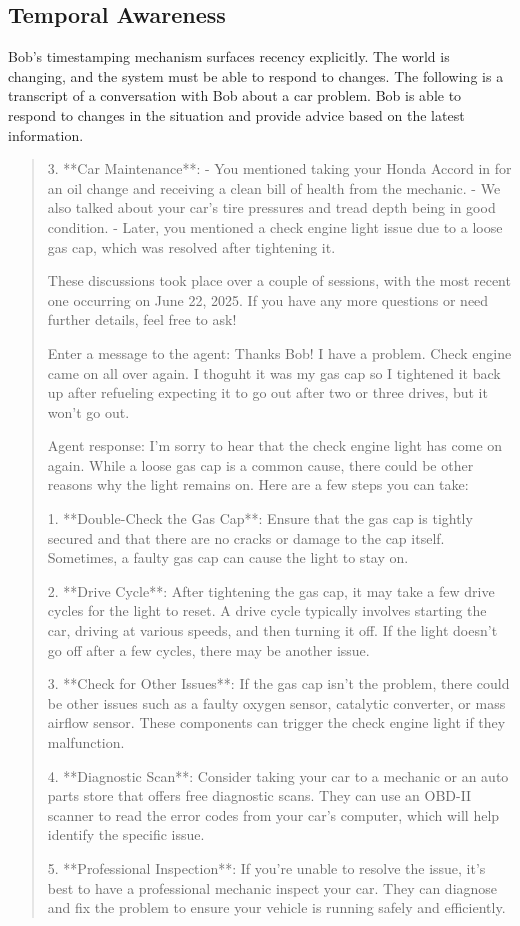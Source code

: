 \documentclass[conference]{IEEEtran}
\begin{document}
\subsection{Temporal Awareness}
Bob's timestamping mechanism surfaces recency explicitly. 
The world is changing, and the system must be able to respond 
to changes.  The following is a transcript of a 
conversation with Bob about a car problem.  Bob is able 
to respond to changes in the situation and provide advice 
based on the latest information.



\begin{quote}
  3. **Car Maintenance**:
  - You mentioned taking your Honda Accord in for an oil change and receiving 
  a clean bill of health from the mechanic.
  - We also talked about your car's tire pressures 
  and tread depth being in good condition.
  - Later, you mentioned a check engine light issue due 
  to a loose gas cap, which was resolved after tightening it.

These discussions took place over a couple of sessions, 
with the most recent one occurring on June 22, 2025. 
If you have any more questions or need further details, 
feel free to ask!

Enter a message to the agent: Thanks Bob!  I have a problem.  
Check engine came on all over again.  I thoguht it was my gas cap 
so I tightened it back up after refueling expecting 
it to go out after two or three drives, but it won't go out.

Agent response: I'm sorry to hear that the check engine light 
has come on again. While a loose gas cap is a common cause, 
there could be other reasons why the light remains on. 
Here are a few steps you can take:

1. **Double-Check the Gas Cap**: Ensure that the gas cap is tightly 
secured and that there are no cracks or damage to the cap itself. 
Sometimes, a faulty gas cap can cause the light to stay on.

2. **Drive Cycle**: After tightening the gas cap, 
it may take a few drive cycles for the light to reset. 
A drive cycle typically involves starting the car, 
driving at various speeds, and then turning it off. 
If the light doesn't go off after a few cycles, 
there may be another issue.

3. **Check for Other Issues**: If the gas cap isn't the problem, 
there could be other issues such as a faulty oxygen sensor, 
catalytic converter, or mass airflow sensor. These components 
can trigger the check engine light if they malfunction.

4. **Diagnostic Scan**: Consider taking your car to a mechanic 
or an auto parts store that offers free diagnostic scans. 
They can use an OBD-II scanner to read the error codes 
from your car's computer, which will help identify the specific issue.

5. **Professional Inspection**: If you're unable to resolve 
the issue, it's best to have a professional mechanic inspect 
your car. They can diagnose and fix the problem 
to ensure your vehicle is running safely and efficiently.

\end{quote}
\end{document}
